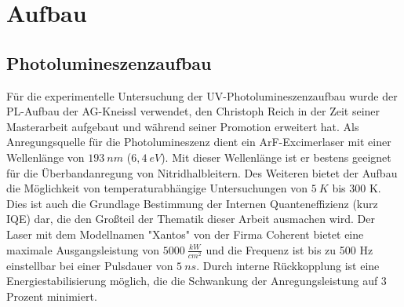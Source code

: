 
\chapter{Aufbau}


\thispagestyle{fancy}

\section{Photolumineszenzaufbau}

Für die experimentelle Untersuchung der UV-Photolumineszenzaufbau wurde der PL-Aufbau der AG-Kneissl verwendet, den Christoph Reich in der Zeit seiner Masterarbeit aufgebaut und während seiner Promotion erweitert hat\cite{creich}. 
Als Anregungsquelle für die Photolumineszenz dient ein ArF-Excimerlaser mit einer Wellenlänge von $193 \ nm$ ($6,4 \ eV$). Mit dieser Wellenlänge ist er bestens geeignet für die Überbandanregung von Nitridhalbleitern. 
Des Weiteren bietet der Aufbau die Möglichkeit von temperaturabhängige Untersuchungen von $5 \ K $ bis 300 K. Dies ist auch die Grundlage Bestimmung der Internen Quanteneffizienz (kurz IQE) dar, die den Großteil der Thematik dieser Arbeit ausmachen wird. Der Laser mit dem Modellnamen  "Xantos" von der Firma Coherent bietet eine maximale Ausgangsleistung von $ 5000 \ \frac{kW}{cm^2} $ und die Frequenz ist bis zu 500 Hz einstellbar bei einer Pulsdauer von $5 \ ns$. Durch interne Rückkopplung ist eine Energiestabilisierung möglich, die die Schwankung der Anregungsleistung auf 3 Prozent minimiert. 
\newline




